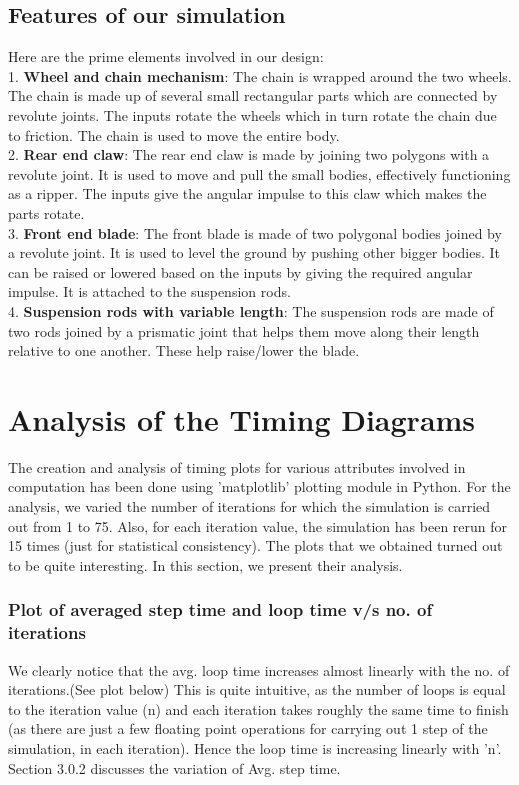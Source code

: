 \documentclass[11pt]{article}
\begin{document}
\subsection{Features of our simulation} 
Here are the prime elements involved in our design: \\
1. \textbf{Wheel and chain mechanism}:
The chain is wrapped around the two wheels. The chain is made up of several small rectangular parts which are connected by revolute joints.
The inputs rotate the wheels which in turn rotate the chain due to friction. The chain is used to move the entire body. \\
2. \textbf{Rear end claw}: 
The rear end claw is made by joining two polygons with a revolute joint. It is used to move and pull the small bodies, effectively functioning as a ripper. The inputs give the angular impulse to this claw which makes the parts rotate. \\
3. \textbf{Front end blade}: 
The front blade is made of two polygonal bodies joined by a revolute joint. It is used to level the ground by pushing other bigger bodies. It can be raised or lowered based on the inputs by giving the required angular impulse. It is attached to the suspension rods. \\ 
4. \textbf{Suspension rods with variable length}:
The suspension rods are made of two rods joined by a prismatic joint that helps them move along their length relative to one another. These help raise/lower the blade. \\

\section{Analysis of the Timing Diagrams} 

The creation and analysis of timing plots for various attributes involved in computation has been done using 'matplotlib' plotting module\cite{matplotlib} in Python. For the analysis, we varied the number of iterations for which the simulation is carried out from 1 to 75. Also, for each iteration value, the simulation has been rerun for 15 times (just for statistical consistency). The plots that we obtained turned out to be quite interesting. In this section, we present their analysis. \\

\subsubsection{Plot of averaged step time and loop time v/s no. of iterations}
We clearly notice that the avg. loop time increases almost linearly with the no. of iterations.(See plot below) This is quite intuitive, as the number of loops is equal to the iteration value (n) and each iteration takes roughly the same time to finish (as there are just a few floating point operations for carrying out 1 step of the simulation, in each iteration). Hence the loop time is increasing linearly with 'n'. Section 3.0.2 discusses the variation of Avg. step time.
\end{document}
